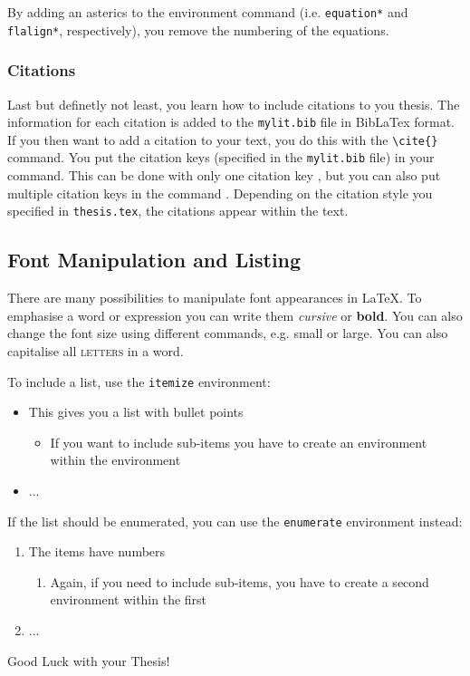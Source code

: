 By adding an asterics to the environment command (i.e. \verb|equation*| and \verb|flalign*|, respectively), you remove the numbering of the equations.


\subsubsection*{Citations}
Last but definetly not least, you learn how to include citations to you thesis. The information for each citation is added to the \texttt{mylit.bib} file in BibLaTex format. If you then want to add a citation to your text, you do this with the \verb|\cite{}| command. You put the citation keys (specified in the \texttt{mylit.bib} file) in your command. This can be done with only one citation key \cite{SaaSchTue97}, but you can also put multiple citation keys in the command \cite{TueConSaa96ismis,SchTueSaa98preprint}. Depending on the citation style you specified in \texttt{thesis.tex}, the citations appear within the text.


\subsection{Font Manipulation and Listing}
There are many possibilities to manipulate font appearances in \LaTeX. To emphasise a word or expression you can write them \emph{cursive} or \textbf{bold}. You can also change the font size using different commands, e.g. {\footnotesize small} or {\Large large}. You can also capitalise all \textsc{letters} in a word.

\noindent To include a list, use the \verb|itemize| environment:
\begin{itemize}
  \item This gives you a list with bullet points
  \begin{itemize}
    \item If you want to include sub-items you have to create an environment within the environment
  \end{itemize}
  \item ...
\end{itemize}

\noindent If the list should be enumerated, you can use the \verb|enumerate| environment instead:
\begin{enumerate}
\item The items have numbers
  \begin{enumerate}
    \item Again, if you need to include sub-items, you have to create a second environment within the first
  \end{enumerate}
\item ...
\end{enumerate}

\vspace*{2cm}
\begin{center}
  \LARGE Good Luck with your Thesis!
\end{center}
  
